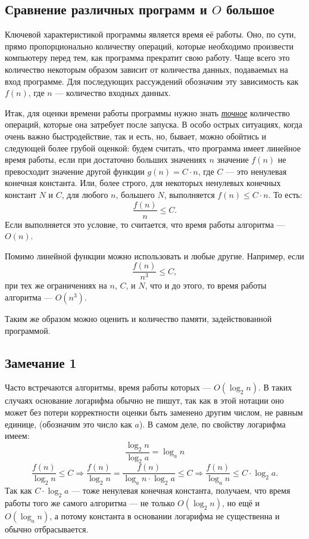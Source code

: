 \subsection{Сравнение различных программ и $O$ большое}
Ключевой характеристикой программы является время её работы. Оно, по сути, прямо пропорционально количеству операций, которые необходимо произвести компьютеру перед тем, как программа прекратит свою работу. Чаще всего это количество некоторым образом зависит от количества данных, подаваемых на вход программе. Для последующих рассуждений обозначим эту зависимость как $f(n)$, где $n$ --- количество входных данных.

Итак, для оценки времени работы программы нужно знать \underline{\emph{точное}} количество операций, которые она затребует после запуска. В особо острых ситуациях, когда очень важно быстродействие, так и есть, но, бывает, можно обойтись и следующей более грубой оценкой: будем считать, что программа имеет линейное время работы, если при достаточно больших значениях $n$ значение $f(n)$ не превосходит значение другой функции $g(n) = C \cdot n$, где $C$ --- это ненулевая конечная константа. Или, более строго, для некоторых ненулевых конечных констант $N$ и $C$, для любого $n$, большего $N$, выполняется $f(n) \le C \cdot n$.
То есть:
$$\frac{f(n)}{n} \le C.$$
Если выполняется это условие, то считается, что время работы алгоритма --- $O(n)$.

Помимо линейной функции можно использовать и любые другие. Например, если
$$\frac{f(n)}{n^3} \le C,$$
при тех же ограничениях на $n$, $C$, и $N$, что и до этого, то время работы алгоритма --- $O(n^3)$.

Таким же образом можно оценить и количество памяти, задействованной программой.

\subsection*{Замечание 1}
Часто встречаются алгоритмы, время работы которых --- $O(\log_2 n)$. В таких случаях основание логарифма обычно не пишут, так как в этой нотации оно может без потери корректности оценки быть заменено другим числом, не равным единице, (обозначим это число как $a$). В самом деле, по свойству логарифма имеем:
$$\frac{\log_2 n}{\log_2 a} = \log_a n$$
$$\frac{f(n)}{\log_2 n} \le C \Rightarrow \frac{f(n)}{\log_2 n} = \frac{f(n)}{\log_a n \cdot \log_2 a} \le C \Rightarrow \frac{f(n)}{\log_a n} \le C \cdot \log_2 a.$$
Так как $C \cdot \log_2 a$ --- тоже ненулевая конечная константа, получаем, что время работы того же самого алгоритма --- не только $O(\log_2 n)$, но ещё и $O(\log_a n)$, а потому константа в основании логарифма не существенна и обычно отбрасывается.

